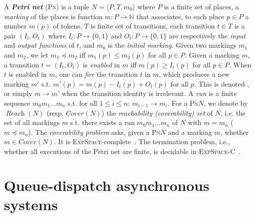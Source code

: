 \documentclass[runningheads,oribibl,]{article}
\newcommand{\mleq}{\preceq}
\newcommand{\NN}{\ensuremath{\mathbb{N}}\xspace}
\newcommand{\petri}{\textsc{Pn}\xspace}
\newcommand{\dexpspace}{\textsc{ExpSpace}\xspace}
\newcommand{\dexpspacecomplete}{\textsc{ExpSpace-C}\xspace}
\DeclareMathOperator{\Reach}{\textit{Reach}}
\newcommand{\Cover}{\ensuremath{\textit{Cover}}}
\begin{document}
\smallskip\noindent A \emph{\bf Petri net} (\petri) is a tuple
$N=\langle P, T, m_0 \rangle$ where $P$ is a finite set of places, a
\emph{marking} of the places is function $m:P\rightarrow \NN$ that
associates, to each place $p\in P$ a number $m(p)$ of tokens, $T$ is
finite set of transitions, each transition $t\in T$ is a pair $(I_t,
O_t)$ where
          $I_t: P\rightarrow \{0,1\}$ and $O_t:
P\rightarrow \{0,1\}$ are respectively the \emph{input} and
\emph{output functions} of $t$, and $m_0$ is the \emph{initial
  marking}. Given two markings $m_1$ and $m_2$, we let $m_1\mleq m_2$
iff $m_1(p)\leq m_2(p)$ for all $p\in P$. Given a marking $m$, a
transition $t=(I_t, O_t)$ is \emph{enabled} in $m$ iff $m(p)\geq
I_t(p)$ for all $p\in P$. When $t$ is enabled in $m$, one can
\emph{fire} the transition $t$ in $m$, which produces a new marking
$m'$ s.t. $m'(p)=m(p)-I_t(p)+O_t(p)$ for all $p$. This is denoted
, or simply $m\rightarrow m'$ when the
transition identity is irrelevant.  A \emph{run} is a finite sequence
$m_0m_1\ldots m_n$ s.t. for all $1\leq i\leq n$: $m_{i-1}\rightarrow
m_i$.  For a \petri $N$, we denote by $\Reach(N)$ (resp. $\Cover(N)$)
the \emph{reachability (coverability) set} of $N$, i.e. the set of all
markings $m$ s.t. there exists a run $m_0m_1\ldots m_n$ of $N$ with
$m=m_n$ ($m\mleq m_n$). The \emph{coverability problem} asks, given a
\petri $N$ and a marking $m$, whether $m\in\Cover(N)$. It is
\dexpspace-complete~\cite{esparza-j-1998-374-a}. The termination
problem, i.e., whether all executions of the Petri net
are finite, is decidable in \dexpspacecomplete~\cite{lipton,rackoff}.






\section{Queue-dispatch asynchronous systems}
\end{document}
